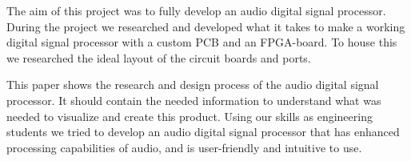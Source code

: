 The aim of this project was to fully develop an audio digital signal processor. During the project we researched and developed what it takes to make a working digital signal processor with a custom PCB and an FPGA-board. To house this we researched the ideal layout of the circuit boards and ports. 
\par
\noindent This paper shows the research and design process of the audio digital signal processor. It should contain the needed information to understand what was needed to visualize and create this product. 
Using our skills as engineering students we tried to develop an audio digital signal processor that has enhanced processing capabilities of audio, and is user-friendly and intuitive to use. 
